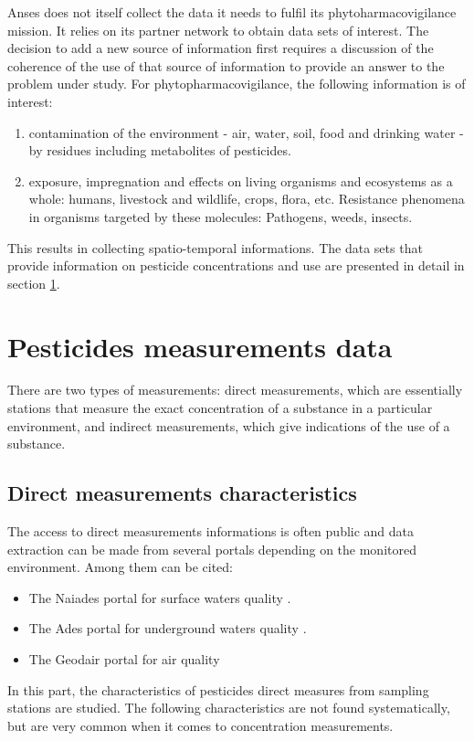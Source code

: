 Anses does not itself collect the data it needs to fulfil its phytoharmacovigilance mission. It relies on its partner network to obtain data sets of interest. The decision to add a new source of information first requires a discussion of the coherence of the use of that source of information to provide an answer to the problem under study. For phytopharmacovigilance, the following information is of interest: 
\begin{enumerate}
\item contamination of the environment - air, water, soil, food and drinking water - by residues including metabolites of pesticides.
\item exposure, impregnation and effects on living organisms and ecosystems as a whole: humans, livestock and wildlife, crops, flora, etc. Resistance phenomena in organisms targeted by these molecules: Pathogens, weeds, insects.
\end{enumerate}
This results in collecting spatio-temporal informations. The data sets that provide information on pesticide concentrations and use are presented in detail in section \ref{chp:2:3}.

\section{Pesticides measurements data}\label{chp:2:3}

There are two types of measurements: direct measurements, which are essentially stations that measure the exact concentration of a substance in a particular environment, and indirect measurements, which give indications of the use of a substance.

\subsection{Direct measurements characteristics}

The access to direct measurements informations is often public and data extraction can be made from several portals depending on the monitored environment. Among them can be cited:
\begin{itemize}
\item The Naiades portal for surface waters quality \citep{Naiade2}.
\item The Ades portal for underground waters quality \citep{Ades}.
\item The Geodair portal for air quality \citep{Geodair} 
\end{itemize}  
In this part, the characteristics of pesticides direct measures from sampling stations are studied. The following characteristics are not found systematically, but are very common when it comes to concentration measurements. 
